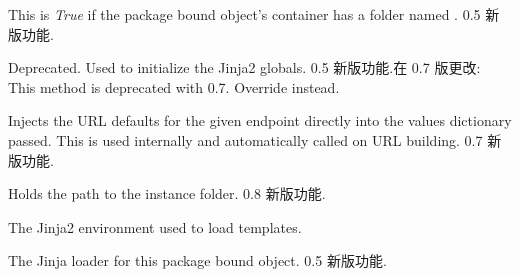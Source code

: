 \documentclass[a4paper,12pt]{sphinxmanual}
\begin{document}
\begin{fulllineitems}

\begin{fulllineitems}
\label{api:flask.Flask.has_static_folder}
This is \emph{True} if the package bound object's container has a
folder named .
0.5 新版功能.
\end{fulllineitems}


\begin{fulllineitems}
\label{api:flask.Flask.init_jinja_globals}
Deprecated.  Used to initialize the Jinja2 globals.
0.5 新版功能.在 0.7 版更改: This method is deprecated with 0.7.  Override
{\hyperref[api:flask.Flask.create_jinja_environment]{}} instead.
\end{fulllineitems}


\begin{fulllineitems}
\label{api:flask.Flask.inject_url_defaults}
Injects the URL defaults for the given endpoint directly into
the values dictionary passed.  This is used internally and
automatically called on URL building.
0.7 新版功能.
\end{fulllineitems}


\begin{fulllineitems}
\label{api:flask.Flask.instance_path}
Holds the path to the instance folder.
0.8 新版功能.
\end{fulllineitems}


\begin{fulllineitems}
\label{api:flask.Flask.jinja_env}
The Jinja2 environment used to load templates.

\end{fulllineitems}


\begin{fulllineitems}
\label{api:flask.Flask.jinja_loader}
The Jinja loader for this package bound object.
0.5 新版功能.
\end{fulllineitems}


\end{fulllineitems}
\end{document}
